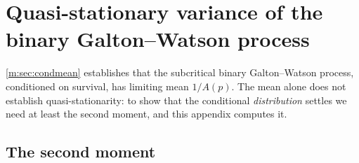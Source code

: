 \section{Quasi-stationary variance of the binary Galton--Watson process}
\label{m:app:variance}

\cref{m:sec:condmean} establishes that the subcritical binary Galton--Watson
process, conditioned on survival, has limiting mean $1/A(p)$. The mean alone
does not establish quasi-stationarity: to show that the conditional
\emph{distribution} settles we need at least the second moment, and this
appendix computes it.

\subsection*{The second moment}

